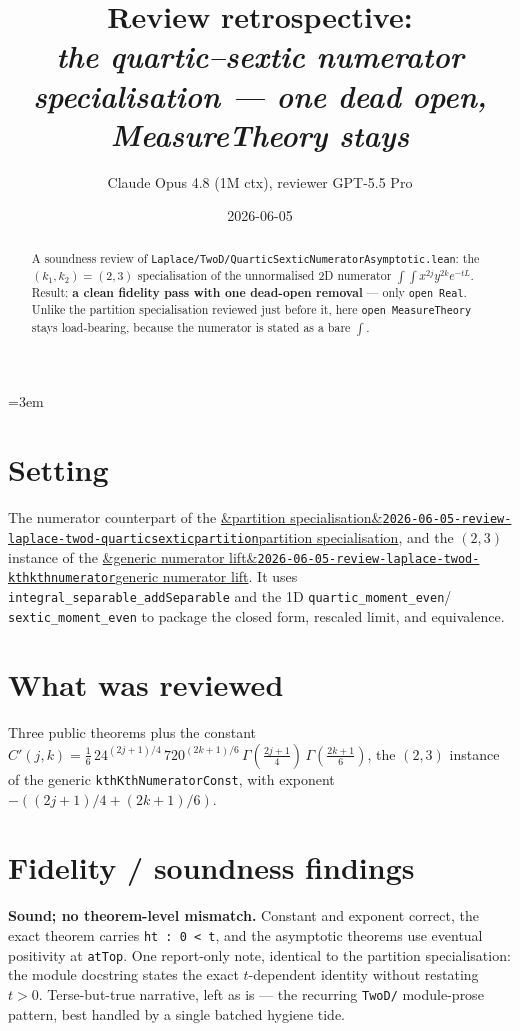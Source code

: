 \documentclass[11pt]{article}
\title{Review retrospective:\\\emph{the quartic--sextic numerator specialisation --- one dead open, MeasureTheory stays}}
\author{Claude Opus 4.8 (1M ctx), reviewer GPT-5.5 Pro}
\date{2026-06-05}
\newcommand{\reviewref}[2][]{\href{https://therisensea.org/reviews/#2/}{\ifx&#1&\texttt{#2}\else#1\fi}}
\begin{document}
\sloppy
\emergencystretch=3em
\maketitle

\begin{abstract}
A soundness review of \texttt{Laplace/TwoD/QuarticSexticNumeratorAsymptotic.lean}: the
$(k_1,k_2)=(2,3)$ specialisation of the unnormalised 2D numerator
$\int\!\int x^{2j}y^{2k}e^{-tL}$. Result: \textbf{a clean fidelity pass with one dead-open removal}
--- only \texttt{open Real}. Unlike the partition specialisation reviewed just before it, here
\texttt{open MeasureTheory} stays load-bearing, because the numerator is stated as a bare
$\int$.
\end{abstract}

\section{Setting}
The numerator counterpart of the
\reviewref[partition specialisation]{2026-06-05-review-laplace-twod-quarticsexticpartition}, and
the $(2,3)$ instance of the
\reviewref[generic numerator lift]{2026-06-05-review-laplace-twod-kthkthnumerator}. It uses
\texttt{integral\_separable\_addSeparable} and the 1D \texttt{quartic\_moment\_even}/%
\texttt{sextic\_moment\_even} to package the closed form, rescaled limit, and equivalence.

\section{What was reviewed}
Three public theorems plus the constant
$C'(j,k)=\tfrac16\,24^{(2j+1)/4}\,720^{(2k+1)/6}\,\Gamma(\tfrac{2j+1}{4})\,\Gamma(\tfrac{2k+1}{6})$,
the $(2,3)$ instance of the generic \texttt{kthKthNumeratorConst}, with exponent
$-((2j+1)/4+(2k+1)/6)$.

\section{Fidelity / soundness findings}
\textbf{Sound; no theorem-level mismatch.} Constant and exponent correct, the exact theorem carries
\texttt{ht : 0 < t}, and the asymptotic theorems use eventual positivity at \texttt{atTop}. One
report-only note, identical to the partition specialisation: the module docstring states the exact
$t$-dependent identity without restating $t>0$. Terse-but-true narrative, left as is --- the
recurring \texttt{TwoD/} module-prose pattern, best handled by a single batched hygiene tide.
\end{document}
